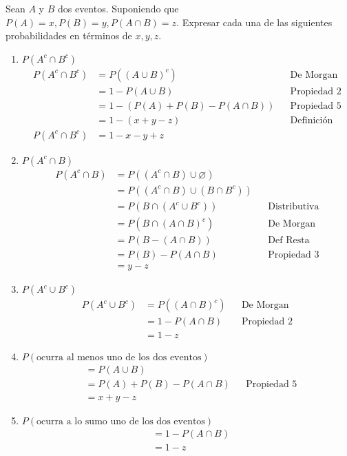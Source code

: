 \item Sean $A$ y $B$ dos eventos. Suponiendo que $P(A)=x,P(B)=y,P(A\cap B)=z$. Expresar cada una de las siguientes probabilidades en términos de $x,y,z$.
    \begin{enumerate}
        \item $P(A^c\cap B^c)$
            \begin{align*}
                P(A^c\cap B^c)&=P((A\cup B)^c)&&\text{De Morgan}\\
                &=1-P(A\cup B)&&\text{Propiedad 2}\\
                &=1-(P(A)+P(B)-P(A\cap B))&&\text{Propiedad 5}\\
                &=1-(x+y-z)&&\text{Definición}\\
                P(A^c\cap B^c)&=1-x-y+z
            \end{align*}
        \item $P(A^c\cap B)$
            \begin{align*}
                P(A^c\cap B)&=P((A^c\cap B) \cup\varnothing)\\
                &=P((A^c\cap B)\cup(B\cap B^c))\\
                &=P(B\cap(A^c\cup B^c))&&\text{Distributiva}\\
                &=P(B\cap(A\cap B)^c)&&\text{De Morgan}\\
                &=P(B-(A\cap B))&&\text{Def Resta}\\
                &=P(B)-P(A\cap B)&&\text{Propiedad 3}\\
                &=y-z
            \end{align*}
        \item $P(A^c\cup B^c)$
            \begin{align*}
                P(A^c\cup B^c)&=P((A\cap B)^c)&&\text{De Morgan}\\
                &=1-P(A\cap B)&&\text{Propiedad 2}\\
                &=1-z
            \end{align*}
        \item $P(\text{ocurra al menos uno de los dos eventos})$
            \begin{align*}
                &=P(A\cup B)\\
                &=P(A)+P(B)-P(A\cap B)&&\text{Propiedad 5}\\
                &=x+y-z
            \end{align*}
        \item $P(\text{ocurra a lo sumo uno de los dos eventos})$
            \begin{align*}
                &=1-P(A\cap B)\\
                &=1-z
            \end{align*}
    \end{enumerate}